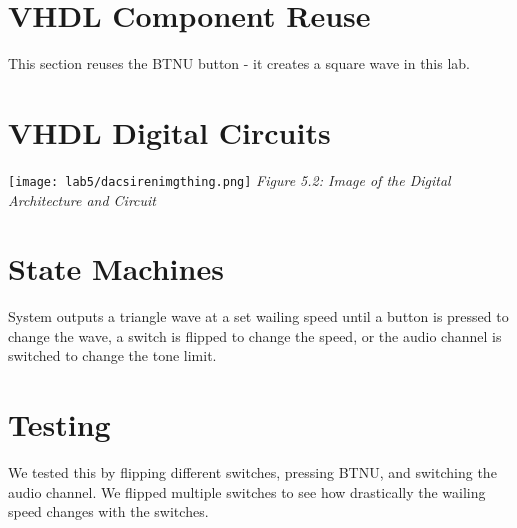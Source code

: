 \section{VHDL Component Reuse}
 This section reuses the BTNU button - it creates a square wave in this lab.
 \section{VHDL Digital Circuits}
    \texttt{[image: lab5/dacsirenimgthing.png]}
    \emph{Figure 5.2: Image of the Digital Architecture and Circuit}
 \section{State Machines}
 System outputs a triangle wave at a set wailing speed until a button is pressed to change the wave, a switch is flipped to change the speed, or the audio channel is switched to change the tone limit.
 \section{Testing}
 We tested this by flipping different switches, pressing BTNU, and switching the audio channel.  We flipped multiple switches to see how drastically the wailing speed changes with the switches.
